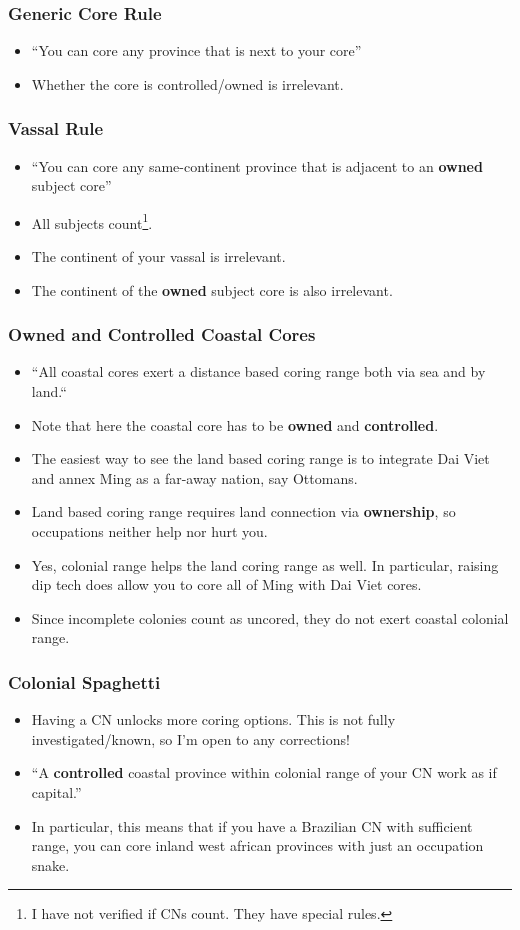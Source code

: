 \documentclass{beamer}
\begin{document}
\begin{frame}
  \frametitle{Generic Core Rule}
  \begin{itemize}
    \item ``You can core any province that is next to your core''
    \item Whether the core is controlled/owned is irrelevant.
  \end{itemize}
\end{frame}

\begin{frame}
  \frametitle{Vassal Rule}
  \begin{itemize}
    \item ``You can core any same-continent province that is adjacent to an \textbf{owned} subject core''
    \item All subjects count\footnote{I have not verified if CNs count. They have special rules.}.
    \item The continent of your vassal is irrelevant.
    \item The continent of the \textbf{owned} subject core is also irrelevant.
  \end{itemize}
\end{frame}

\begin{frame}
  \frametitle{\textbf{Owned} and \textbf{Controlled} Coastal Cores} 
  \begin{itemize}
    \item ``All coastal cores exert a distance based coring range both via sea and by land.``
    \item Note that here the coastal core has to be \textbf{owned} and \textbf{controlled}.
    \item The easiest way to see the land based coring range is to integrate Dai Viet and annex Ming as a far-away nation, say Ottomans.
    \item Land based coring range requires land connection via \textbf{ownership}, so occupations neither help nor hurt you.
    \item Yes, colonial range helps the land coring range as well. In particular, raising dip tech does allow you to core all of Ming with Dai Viet cores.
    \item Since incomplete colonies count as uncored, they do not exert coastal colonial range.
  \end{itemize}
\end{frame}

\begin{frame}
  \frametitle{Colonial Spaghetti}
  \begin{itemize}
    \item Having a CN unlocks more coring options. This is not fully investigated/known, so I'm open to any corrections!
    \item ``A \textbf{controlled} coastal province within colonial range of your CN work as if capital.''
    \item In particular, this means that if you have a Brazilian CN with sufficient range, you can core inland west african provinces with just an occupation snake.
  \end{itemize}
\end{frame}
\end{document}
